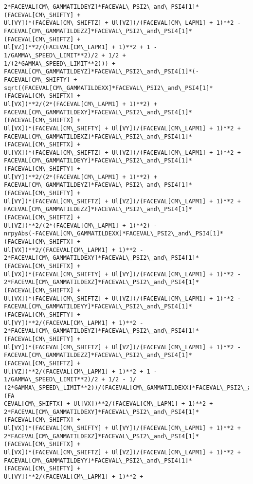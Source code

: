 \documentclass[landscape,letterpaper,10pt,english]{article}
\begin{document}
\begin{Verbatim}[commandchars=\\\{\}]
2*FACEVAL[CM\_GAMMATILDEYZ]*FACEVAL\_PSI2\_and\_PSI4[1]*(FACEVAL[CM\_SHIFTY] +
Ul[VY])*(FACEVAL[CM\_SHIFTZ] + Ul[VZ])/(FACEVAL[CM\_LAPM1] + 1)**2 -
FACEVAL[CM\_GAMMATILDEZZ]*FACEVAL\_PSI2\_and\_PSI4[1]*(FACEVAL[CM\_SHIFTZ] +
Ul[VZ])**2/(FACEVAL[CM\_LAPM1] + 1)**2 + 1 - 1/GAMMA\_SPEED\_LIMIT**2)/2 + 1/2 +
1/(2*GAMMA\_SPEED\_LIMIT**2))) +
FACEVAL[CM\_GAMMATILDEYZ]*FACEVAL\_PSI2\_and\_PSI4[1]*(-FACEVAL[CM\_SHIFTY] +
sqrt((FACEVAL[CM\_GAMMATILDEXX]*FACEVAL\_PSI2\_and\_PSI4[1]*(FACEVAL[CM\_SHIFTX] +
Ul[VX])**2/(2*(FACEVAL[CM\_LAPM1] + 1)**2) +
FACEVAL[CM\_GAMMATILDEXY]*FACEVAL\_PSI2\_and\_PSI4[1]*(FACEVAL[CM\_SHIFTX] +
Ul[VX])*(FACEVAL[CM\_SHIFTY] + Ul[VY])/(FACEVAL[CM\_LAPM1] + 1)**2 +
FACEVAL[CM\_GAMMATILDEXZ]*FACEVAL\_PSI2\_and\_PSI4[1]*(FACEVAL[CM\_SHIFTX] +
Ul[VX])*(FACEVAL[CM\_SHIFTZ] + Ul[VZ])/(FACEVAL[CM\_LAPM1] + 1)**2 +
FACEVAL[CM\_GAMMATILDEYY]*FACEVAL\_PSI2\_and\_PSI4[1]*(FACEVAL[CM\_SHIFTY] +
Ul[VY])**2/(2*(FACEVAL[CM\_LAPM1] + 1)**2) +
FACEVAL[CM\_GAMMATILDEYZ]*FACEVAL\_PSI2\_and\_PSI4[1]*(FACEVAL[CM\_SHIFTY] +
Ul[VY])*(FACEVAL[CM\_SHIFTZ] + Ul[VZ])/(FACEVAL[CM\_LAPM1] + 1)**2 +
FACEVAL[CM\_GAMMATILDEZZ]*FACEVAL\_PSI2\_and\_PSI4[1]*(FACEVAL[CM\_SHIFTZ] +
Ul[VZ])**2/(2*(FACEVAL[CM\_LAPM1] + 1)**2) -
nrpyAbs(-FACEVAL[CM\_GAMMATILDEXX]*FACEVAL\_PSI2\_and\_PSI4[1]*(FACEVAL[CM\_SHIFTX] +
Ul[VX])**2/(FACEVAL[CM\_LAPM1] + 1)**2 -
2*FACEVAL[CM\_GAMMATILDEXY]*FACEVAL\_PSI2\_and\_PSI4[1]*(FACEVAL[CM\_SHIFTX] +
Ul[VX])*(FACEVAL[CM\_SHIFTY] + Ul[VY])/(FACEVAL[CM\_LAPM1] + 1)**2 -
2*FACEVAL[CM\_GAMMATILDEXZ]*FACEVAL\_PSI2\_and\_PSI4[1]*(FACEVAL[CM\_SHIFTX] +
Ul[VX])*(FACEVAL[CM\_SHIFTZ] + Ul[VZ])/(FACEVAL[CM\_LAPM1] + 1)**2 -
FACEVAL[CM\_GAMMATILDEYY]*FACEVAL\_PSI2\_and\_PSI4[1]*(FACEVAL[CM\_SHIFTY] +
Ul[VY])**2/(FACEVAL[CM\_LAPM1] + 1)**2 -
2*FACEVAL[CM\_GAMMATILDEYZ]*FACEVAL\_PSI2\_and\_PSI4[1]*(FACEVAL[CM\_SHIFTY] +
Ul[VY])*(FACEVAL[CM\_SHIFTZ] + Ul[VZ])/(FACEVAL[CM\_LAPM1] + 1)**2 -
FACEVAL[CM\_GAMMATILDEZZ]*FACEVAL\_PSI2\_and\_PSI4[1]*(FACEVAL[CM\_SHIFTZ] +
Ul[VZ])**2/(FACEVAL[CM\_LAPM1] + 1)**2 + 1 - 1/GAMMA\_SPEED\_LIMIT**2)/2 + 1/2 - 1/
(2*GAMMA\_SPEED\_LIMIT**2))/(FACEVAL[CM\_GAMMATILDEXX]*FACEVAL\_PSI2\_and\_PSI4[1]*(FA
CEVAL[CM\_SHIFTX] + Ul[VX])**2/(FACEVAL[CM\_LAPM1] + 1)**2 +
2*FACEVAL[CM\_GAMMATILDEXY]*FACEVAL\_PSI2\_and\_PSI4[1]*(FACEVAL[CM\_SHIFTX] +
Ul[VX])*(FACEVAL[CM\_SHIFTY] + Ul[VY])/(FACEVAL[CM\_LAPM1] + 1)**2 +
2*FACEVAL[CM\_GAMMATILDEXZ]*FACEVAL\_PSI2\_and\_PSI4[1]*(FACEVAL[CM\_SHIFTX] +
Ul[VX])*(FACEVAL[CM\_SHIFTZ] + Ul[VZ])/(FACEVAL[CM\_LAPM1] + 1)**2 +
FACEVAL[CM\_GAMMATILDEYY]*FACEVAL\_PSI2\_and\_PSI4[1]*(FACEVAL[CM\_SHIFTY] +
Ul[VY])**2/(FACEVAL[CM\_LAPM1] + 1)**2 +

\end{Verbatim}
\end{document}
